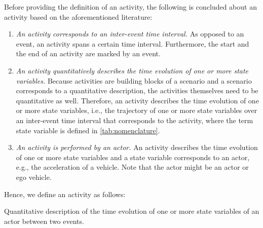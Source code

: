 Before providing the definition of an activity, the following is concluded about an activity based on the aforementioned literature:

\begin{enumerate}
	\item\textit{An activity corresponds to an inter-event time interval.}
	As opposed to an event, an activity spans a certain time interval. Furthermore, the start and the end of an activity are marked by an event.
	
	\item\textit{An activity quantitatively describes the time evolution of \cstarte one or more \cende state variables.}
	Because activities are building blocks of a scenario and a scenario corresponds to a quantitative description, the activities themselves need to be quantitative as well. 
	Therefore, an activity describes the time evolution of one or more state variables, i.e., the trajectory of one or more state variables over an inter-event time interval that corresponds to the activity, where the term state variable is defined in \cref{tab:nomenclature}.
	
	\item\textit{An activity is performed by an actor.}
	An activity describes the time evolution of one or more state variables and a state variable corresponds to an actor, e.g., the acceleration of a vehicle. Note that the actor might be an actor or ego vehicle. 
\end{enumerate}

Hence, we define an activity as follows:
\begin{definition}[Activity]
	\label{def:activity}
	Quantitative description of the time evolution of one or more state variables of an actor between two events.
\end{definition}




